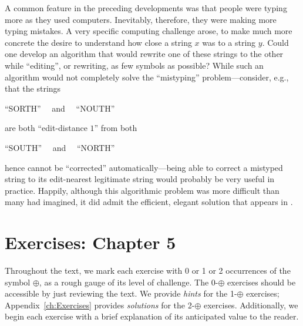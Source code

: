 A common feature in the preceding developments was that people were typing more as they used computers.  Inevitably, therefore, they were making more typing mistakes.  A very specific computing challenge arose, to make much more concrete the desire to understand how close a
string $x$ was to a string $y$.  Could one develop an algorithm that would rewrite one of these strings to the other while ``editing'', or rewriting, as few symbols as possible?  While such an algorithm would not completely solve the ``mistyping'' problem---consider, e.g., that the strings

\hspace*{.25in} ``SORTH'' \ \ and \ \ ``NOUTH''

\noindent
are both ``edit-distance $1$'' from both

\hspace*{.25in} ``SOUTH'' \ \ and \ \ ``NORTH''

\noindent
hence cannot be ``corrected'' automatically---being able to correct a mistyped string to its edit-nearest legitimate string would probably be very useful in practice.  Happily, although this algorithmic problem was more difficult than many had imagined, it did admit the efficient, elegant solution that appears in \cite{WagnerF74}.



\section{Exercises: Chapter 5}

Throughout the text, we mark each exercise with 0 or 1 or 2 occurrences of the symbol $\oplus$, as a rough gauge of its level of challenge.  The 0-$\oplus$ exercises should be accessible by just reviewing the text.  We provide {\em hints} for the 1-$\oplus$ exercises; Appendix~\ref{ch:Exercises} provides {\em solutions} for the 2-$\oplus$ exercises.  Additionally, we begin each exercise with a brief explanation of its anticipated value to the reader.
 
